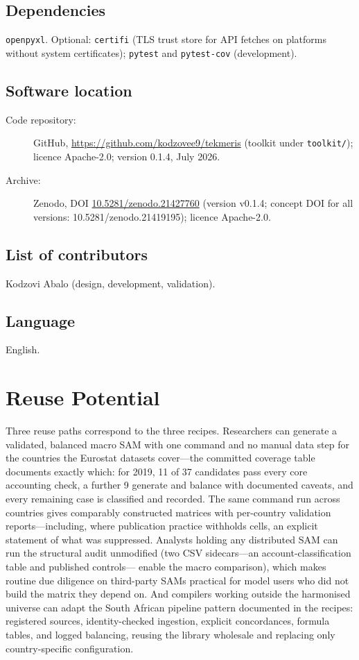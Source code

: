 \documentclass[11pt,a4paper]{article}
\begin{document}
\subsection{Dependencies}
\texttt{openpyxl}. Optional: \texttt{certifi} (TLS trust store for API
fetches on platforms without system certificates); \texttt{pytest} and
\texttt{pytest-cov} (development).

\subsection{Software location}
\begin{description}
  \item[Code repository:] GitHub,
  \url{https://github.com/kodzovee9/tekmeris} (toolkit under
  \texttt{toolkit/}); licence Apache-2.0; version 0.1.4, July 2026.
  \item[Archive:] Zenodo, DOI
  \href{https://doi.org/10.5281/zenodo.21427760}{10.5281/zenodo.21427760}
  (version v0.1.4; concept DOI for all versions:
  10.5281/zenodo.21419195); licence Apache-2.0.
\end{description}

\subsection{List of contributors}
Kodzovi Abalo (design, development, validation).

\subsection{Language}
English.

\section{Reuse Potential}

Three reuse paths correspond to the three recipes. Researchers can
generate a validated, balanced macro SAM with one command and no manual
data step for the countries the Eurostat datasets cover---the committed
coverage table documents exactly which: for 2019, 11 of 37 candidates
pass every core accounting check, a further 9 generate and balance with
documented caveats, and every remaining case is classified and
recorded. The same command run across countries gives
comparably constructed matrices with per-country validation reports---including, where publication practice withholds cells, an
explicit statement of what was suppressed. Analysts holding any
distributed SAM can run the structural audit unmodified (two CSV
sidecars---an account-classification table and published controls---
enable the macro comparison), which makes routine due diligence on
third-party SAMs practical for model users who did not build the matrix
they depend on. And compilers working outside the harmonised
universe can adapt the South African pipeline pattern documented in the
recipes: registered sources, identity-checked ingestion, explicit
concordances, formula tables, and logged balancing, reusing the library
wholesale and replacing only country-specific configuration.
\end{document}
